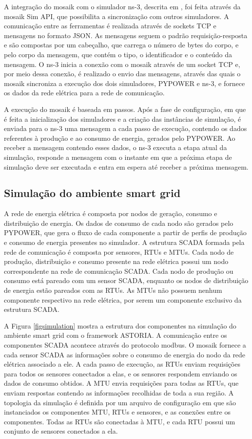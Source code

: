 \documentclass[cic,tc]{iiufrgs}
\begin{document}
A integração do mosaik com o simulador ns-3, descrita em \cite{wermann2015astoria}, foi feita através da mosaik Sim API, que possibilita a sincronização com outros simuladores. A comunicação entre as ferramentas é realizada através de sockets TCP e mensagens  no formato JSON. As mensagens seguem o padrão requisição-resposta e são compostas por um cabeçalho, que carrega o número de bytes do corpo, e pelo corpo da mensagem, que contém o tipo, o identificador e o conteúdo da mensagem. O ns-3 inicia a conexão com o mosaik através de um socket TCP e, por meio dessa conexão, é realizado o envio das mensagens, através das quais o mosaik sincroniza a execução dos dois simuladores, PYPOWER e ns-3, e fornece os dados da rede elétrica para a rede de comunicação.
 
A execução do mosaik é baseada em passos. Após a fase de configuração, em que é feita a inicialização dos simuladores e a criação das instâncias de simulação, é enviada para o ns-3 uma mensagem a cada passo de execução, contendo os dados referentes à produção e ao consumo de energia, gerados pelo PYPOWER. Ao receber a mensagem contendo esses dados, o ns-3 executa a etapa atual da simulação, responde a mensagem com o instante em que a próxima etapa de simulação deve ser executada e entra em espera até receber a próxima mensagem.

\subsection{Simulação do ambiente smart grid}
\label{subsecestrut}

A rede de energia elétrica é composta por nodos de geração, consumo e distribuição de energia. Os dados de consumo de cada nodo são gerados pelo PYPOWER, que gera o fluxo de cada componente a partir de perfis de produção e consumo de energia presentes no simulador. A estrutura SCADA formada pela rede de comunicação é composta por sensores, RTUs e MTUs. Cada nodo de produção, distribuição e consumo presente na rede elétrica possui um nodo correspondente na rede de comunicação SCADA. Cada nodo de produção ou consumo está pareado com um sensor SCADA, enquanto os nodos de distribuição de energia estão pareados com as RTUs. As MTUs não possuem nenhum componente respectivo na rede elétrica, por serem um componente exclusivo da estrutura SCADA.

A Figura \ref{figsimulation} mostra a estrutura dos componentes na simulação do ambiente smart grid com o framework ASTORIA. A comunicação entre os componentes SCADA acontece através do protocolo modbus. O mosaik fornece a cada sensor SCADA as informações sobre o consumo de energia do nodo da rede elétrica associado a ele. A cada passo de execução, as RTUs enviam requisições para todos os sensores conectados a elas, e os sensores respondem enviando os dados de consumo obtidos. A MTU envia requisições para todas as RTUs, que enviam respostas contendo as informações recolhidas de toda a sua região. A topologia da simulação é definida por um arquivo de configuração em que são instanciados os componentes MTU, RTUs e sensores, e as conexões entre os componentes. Todas as RTUs são conectadas à MTU, e cada RTU possui um conjunto de sensores conectados a ela.
\end{document}
